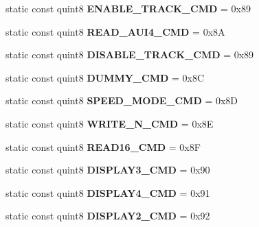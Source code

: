 \begin{DoxyCompactItemize}
\item 
\mbox{\label{class_n_c_e_message_a930ba131bfd79c452836a3b256f979c4}} 
static const quint8 {\bfseries E\+N\+A\+B\+L\+E\+\_\+\+T\+R\+A\+C\+K\+\_\+\+C\+MD} = 0x89
\item 
\mbox{\label{class_n_c_e_message_aac1564079746b0fdf703a6f29cc4ad33}} 
static const quint8 {\bfseries R\+E\+A\+D\+\_\+\+A\+U\+I4\+\_\+\+C\+MD} = 0x8A
\item 
\mbox{\label{class_n_c_e_message_ae38e9eb5b4ccf36a4004a0194a0f5bc0}} 
static const quint8 {\bfseries D\+I\+S\+A\+B\+L\+E\+\_\+\+T\+R\+A\+C\+K\+\_\+\+C\+MD} = 0x89
\item 
\mbox{\label{class_n_c_e_message_ab0bc8e607d4d53ec2e9c08dc8d72b988}} 
static const quint8 {\bfseries D\+U\+M\+M\+Y\+\_\+\+C\+MD} = 0x8C
\item 
\mbox{\label{class_n_c_e_message_aa1743907c9945e2efb7241b32639f67c}} 
static const quint8 {\bfseries S\+P\+E\+E\+D\+\_\+\+M\+O\+D\+E\+\_\+\+C\+MD} = 0x8D
\item 
\mbox{\label{class_n_c_e_message_ac3c325b65d98f36b5a90d592074aff45}} 
static const quint8 {\bfseries W\+R\+I\+T\+E\+\_\+\+N\+\_\+\+C\+MD} = 0x8E
\item 
\mbox{\label{class_n_c_e_message_ad26e49bc959198a70f6cc3eeed97b585}} 
static const quint8 {\bfseries R\+E\+A\+D16\+\_\+\+C\+MD} = 0x8F
\item 
\mbox{\label{class_n_c_e_message_a3f1f3bf89bd95e37752c75987a12b86a}} 
static const quint8 {\bfseries D\+I\+S\+P\+L\+A\+Y3\+\_\+\+C\+MD} = 0x90
\item 
\mbox{\label{class_n_c_e_message_ab6dac7fb6bd03c70fe7137c9676d3e87}} 
static const quint8 {\bfseries D\+I\+S\+P\+L\+A\+Y4\+\_\+\+C\+MD} = 0x91
\item 
\mbox{\label{class_n_c_e_message_a6f6bf1dd8c806daeded6067daa98a7a5}} 
static const quint8 {\bfseries D\+I\+S\+P\+L\+A\+Y2\+\_\+\+C\+MD} = 0x92

\end{DoxyCompactItemize}

